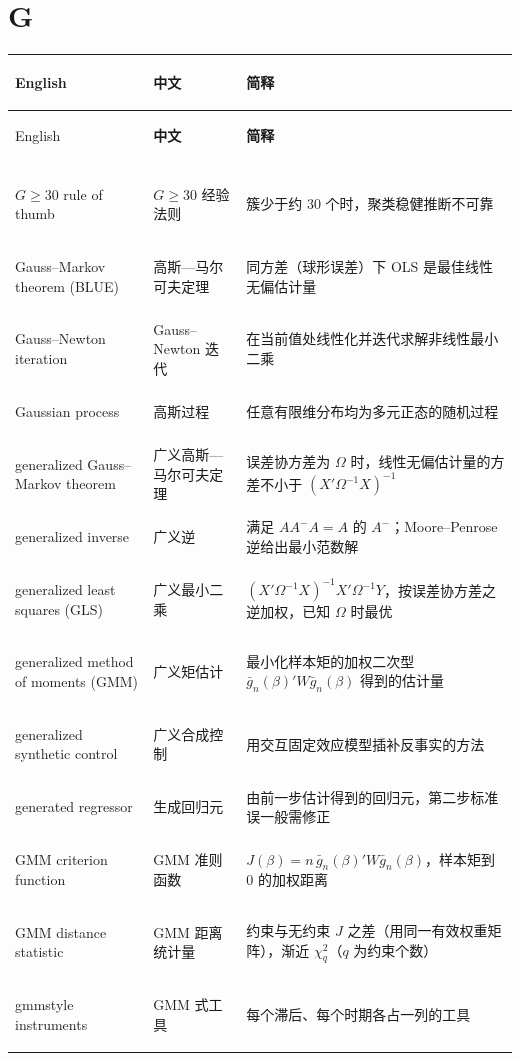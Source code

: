 \section*{G}
\begin{longtable}{@{}>{\bfseries\boldmath\raggedright\arraybackslash}p{4.6cm}>{\raggedright\arraybackslash}p{3.2cm}>{\raggedright\arraybackslash}p{\dimexpr\textwidth-7.8cm-4\tabcolsep\relax}@{}}
\toprule
English & \textbf{中文} & \textbf{简释}\\
\midrule
\endfirsthead
\toprule
English & \textbf{中文} & \textbf{简释}\\
\midrule
\endhead
\midrule
\multicolumn{3}{r@{}}{\footnotesize\itshape （续下页）}\\
\endfoot
\bottomrule
\endlastfoot
$G\ge30$ rule of thumb & $G\ge30$ 经验法则 & 簇少于约 30 个时，聚类稳健推断不可靠 \\
Gauss--Markov theorem (BLUE) & 高斯—马尔可夫定理 & 同方差（球形误差）下 OLS 是最佳线性无偏估计量 \\
Gauss--Newton iteration & Gauss--Newton 迭代 & 在当前值处线性化并迭代求解非线性最小二乘 \\
Gaussian process & 高斯过程 & 任意有限维分布均为多元正态的随机过程 \\
generalized Gauss--Markov theorem & 广义高斯—马尔可夫定理 & 误差协方差为 $\Omega$ 时，线性无偏估计量的方差不小于 $(X'\Omega^{-1}X)^{-1}$ \\
generalized inverse & 广义逆 & 满足 $AA^-A=A$ 的 $A^-$；Moore--Penrose 逆给出最小范数解 \\
generalized least squares (GLS) & 广义最小二乘 & $(X'\Omega^{-1}X)^{-1}X'\Omega^{-1}Y$，按误差协方差之逆加权，已知 $\Omega$ 时最优 \\
generalized method of moments (GMM) & 广义矩估计 & 最小化样本矩的加权二次型 $\bar g_n(\beta)'W\bar g_n(\beta)$ 得到的估计量 \\
generalized synthetic control & 广义合成控制 & 用交互固定效应模型插补反事实的方法 \\
generated regressor & 生成回归元 & 由前一步估计得到的回归元，第二步标准误一般需修正 \\
GMM criterion function & GMM 准则函数 & $J(\beta)=n\,\bar g_n(\beta)'W\bar g_n(\beta)$，样本矩到 0 的加权距离 \\
GMM distance statistic & GMM 距离统计量 & 约束与无约束 $J$ 之差（用同一有效权重矩阵），渐近 $\chi^2_q$（$q$ 为约束个数） \\
gmmstyle instruments & GMM 式工具 & 每个滞后、每个时期各占一列的工具 \\

\end{longtable}
